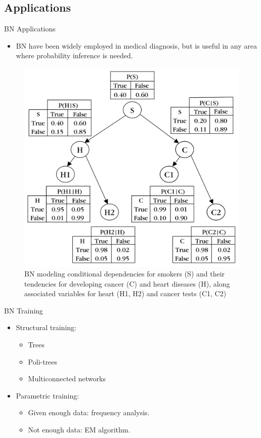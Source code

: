 \documentclass[xcolor=x11names,compress]{beamer}
\renewcommand{\(}{\begin{columns}}
\renewcommand{\)}{\end{columns}}
\newcommand{\<}[1]{\begin{column}{#1}}
\renewcommand{\>}{\end{column}}
\begin{document}
\subsection{Applications}
\begin{frame}{BN Applications}
\begin{itemize}
	\item BN have been widely employed in medical diagnosis, but is useful in any area where probability inference is needed.
\end{itemize}
\begin{figure}[h]
	\centering
	\includegraphics[scale=0.2]{../report/resources/images/ejemplo-red-bayesiana}
	\caption{BN modeling conditional dependencies for smokers (S) and their tendencies for developing cancer (C) and heart diseases (H), along associated variables for heart (H1, H2) and cancer tests (C1, C2)}
	\label{fig:ejemplo-red-bayesiana}
\end{figure}
\end{frame}

\begin{frame}{BN Training}
\begin{itemize}
	\item Structural training:
	\begin{itemize}
		\item Trees
		\item Poli-trees
		\item Multiconnected networks
	\end{itemize}
	\item Parametric training:
	\begin{itemize}
		\item Given enough data: frequency analysis.
		\item Not enough data: EM algorithm.
	\end{itemize}
\end{itemize}
\end{frame}
\end{document}
